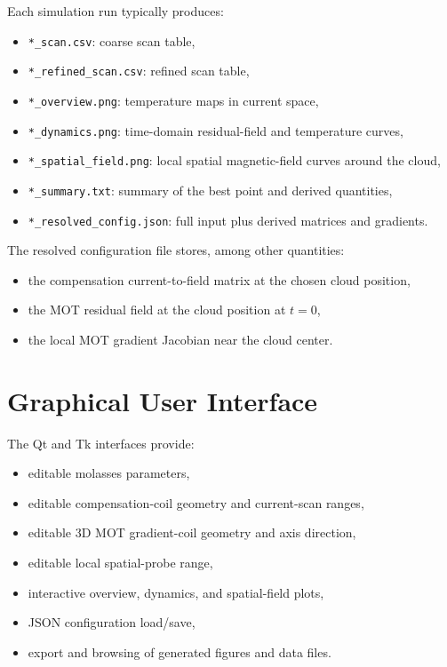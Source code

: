 \documentclass[12pt,a4paper]{article}
\begin{document}
Each simulation run typically produces:
\begin{itemize}
  \item \texttt{*\_scan.csv}: coarse scan table,
  \item \texttt{*\_refined\_scan.csv}: refined scan table,
  \item \texttt{*\_overview.png}: temperature maps in current space,
  \item \texttt{*\_dynamics.png}: time-domain residual-field and temperature curves,
  \item \texttt{*\_spatial\_field.png}: local spatial magnetic-field curves around the cloud,
  \item \texttt{*\_summary.txt}: summary of the best point and derived quantities,
  \item \texttt{*\_resolved\_config.json}: full input plus derived matrices and gradients.
\end{itemize}

The resolved configuration file stores, among other quantities:
\begin{itemize}
  \item the compensation current-to-field matrix at the chosen cloud position,
  \item the MOT residual field at the cloud position at $t=0$,
  \item the local MOT gradient Jacobian near the cloud center.
\end{itemize}

\section{Graphical User Interface}

The Qt and Tk interfaces provide:
\begin{itemize}
  \item editable molasses parameters,
  \item editable compensation-coil geometry and current-scan ranges,
  \item editable 3D MOT gradient-coil geometry and axis direction,
  \item editable local spatial-probe range,
  \item interactive overview, dynamics, and spatial-field plots,
  \item JSON configuration load/save,
  \item export and browsing of generated figures and data files.
\end{itemize}
\end{document}
